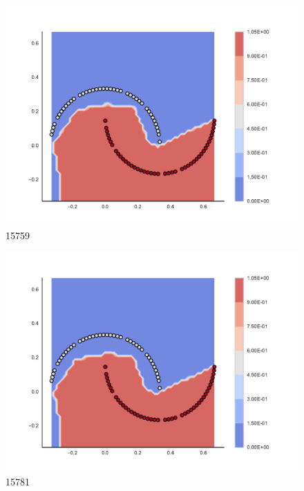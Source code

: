 \begin{subfigure}[b]{0.09\textwidth}
    \includegraphics[clip, trim=2.35cm 1.75cm 4.5cm 0cm,width=\textwidth]{img/convergence/15759.pdf}
    \caption{15759}
    \label{fig:convergence_15759}
\end{subfigure}
%
\begin{subfigure}[b]{0.09\textwidth}
    \includegraphics[clip, trim=2.35cm 1.75cm 4.5cm 0cm,width=\textwidth]{img/convergence/15781.pdf}
    \caption{15781}
    \label{fig:convergence_15781}
\end{subfigure}
%
